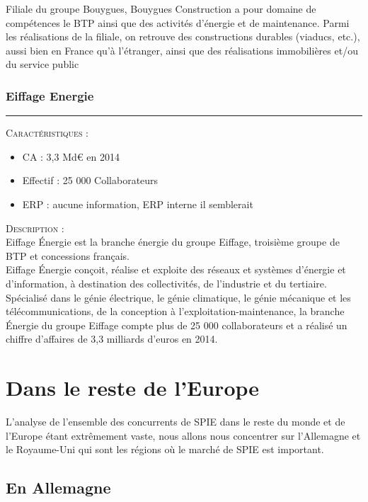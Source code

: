 Filiale du groupe Bouygues, Bouygues Construction a pour domaine de compétences le BTP ainsi que des activités d’énergie et de maintenance. Parmi les réalisations de la filiale, on retrouve des constructions durables (viaducs, etc.), aussi bien en France qu’à l’étranger, ainsi que des réalisations immobilières et/ou du service public

\subsubsection{Eiffage Energie}
\hrule

\begin{shaded}
    \noindent\textsc{Caractéristiques} : \\
    \begin{itemize}
        \item CA : 3,3 Md€ en 2014
        \item Effectif : 25 000 Collaborateurs 
        \item ERP : aucune information, ERP interne il semblerait
    \end{itemize}
\end{shaded}
    
\noindent\textsc{Description} : \\

Eiffage Énergie est la branche énergie du groupe Eiffage, troisième groupe de BTP et concessions français. \\

Eiffage Énergie conçoit, réalise et exploite des réseaux et systèmes d'énergie et d'information, à destination des collectivités, de l’industrie et du tertiaire.
Spécialisé dans le génie électrique, le génie climatique, le génie mécanique et les télécommunications, de la conception à l’exploitation-maintenance, la branche Énergie du groupe Eiffage compte plus de 25 000 collaborateurs et a réalisé un chiffre d’affaires de 3,3 milliards d’euros en 2014.

\section{Dans le reste de l'Europe}
    
L’analyse de l’ensemble des concurrents de SPIE dans le reste du monde et de l’Europe étant extrêmement vaste, nous allons nous concentrer sur l’Allemagne et le Royaume-Uni qui sont les régions où le marché de SPIE est important.

\subsection{En Allemagne}

